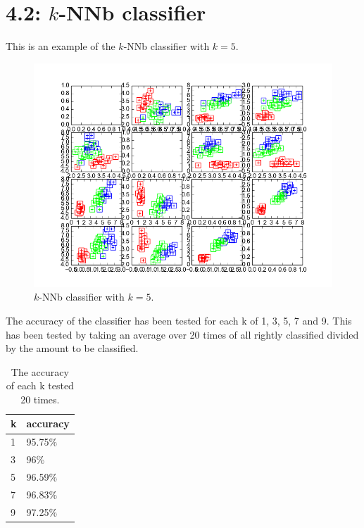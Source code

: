 \documentclass[a4paper,12px]{article}
\begin{document}

\section{4.2: $k$-NNb classifier}
This is an example of the $k$-NNb classifier with $k=5$.
\begin{figure}[!h]
    \centering
    \includegraphics[width=1\textwidth]{knnb_example.png}
    \caption{$k$-NNb classifier with $k=5$.}
    \label{fig:knnb_example}
\end{figure}
\FloatBarrier
The accuracy of the classifier has been tested for each k of 1, 3, 5, 7 and 9.
 This has been tested by taking an average over 20 times of all rightly
 classified divided by the amount to be classified.
\begin{table}[h!]
\centering
\caption{The accuracy of each k tested 20 times.}
\label{my-label}
\begin{tabular}{|l|l|}
\hline
\textbf{k} & \textbf{accuracy}  \\ \hline
1          & 95.75\%            \\ \hline
3          & 96\%               \\ \hline
5          & 96.59\%            \\ \hline
7          & 96.83\%            \\ \hline
9          & 97.25\%            \\ \hline
\end{tabular}
\end{table}
\end{document}
